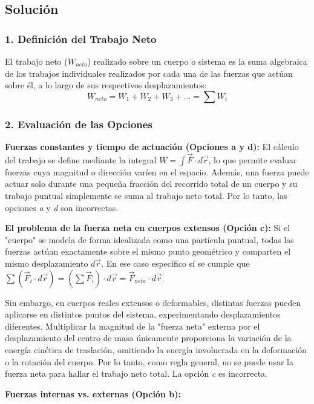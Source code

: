 \documentclass[12pt, a4paper]{article}
\begin{document}
\subsection*{Solución}

\subsubsection*{1. Definición del Trabajo Neto}
El trabajo neto ($W_{neto}$) realizado sobre un cuerpo o sistema es la suma algebraica de los trabajos individuales realizados por cada una de las fuerzas que actúan sobre él, a lo largo de sus respectivos desplazamientos:
$$W_{neto} = W_1 + W_2 + W_3 + \dots = \sum W_i$$

\subsubsection*{2. Evaluación de las Opciones}

\textbf{Fuerzas constantes y tiempo de actuación (Opciones a y d):}
El cálculo del trabajo se define mediante la integral $W = \int \vec{F} \cdot d\vec{r}$, lo que permite evaluar fuerzas cuya magnitud o dirección varíen en el espacio. Además, una fuerza puede actuar solo durante una pequeña fracción del recorrido total de un cuerpo y su trabajo puntual simplemente se suma al trabajo neto total. Por lo tanto, las opciones \textit{a} y \textit{d} son incorrectas.

\textbf{El problema de la fuerza neta en cuerpos extensos (Opción c):}
Si el "cuerpo" se modela de forma idealizada como una partícula puntual, todas las fuerzas actúan exactamente sobre el mismo punto geométrico y comparten el mismo desplazamiento $d\vec{r}$. En ese caso específico sí se cumple que $\sum (\vec{F}_i \cdot d\vec{r}) = (\sum \vec{F}_i) \cdot d\vec{r} = \vec{F}_{neta} \cdot d\vec{r}$. 

Sin embargo, en cuerpos reales extensos o deformables, distintas fuerzas pueden aplicarse en distintos puntos del sistema, experimentando desplazamientos diferentes. Multiplicar la magnitud de la "fuerza neta" externa por el desplazamiento del centro de masa únicamente proporciona la variación de la energía cinética de traslación, omitiendo la energía involucrada en la deformación o la rotación del cuerpo. Por lo tanto, como regla general, no se puede usar la fuerza neta para hallar el trabajo neto total. La opción \textit{c} es incorrecta.

\textbf{Fuerzas internas vs. externas (Opción b):}
\end{document}
